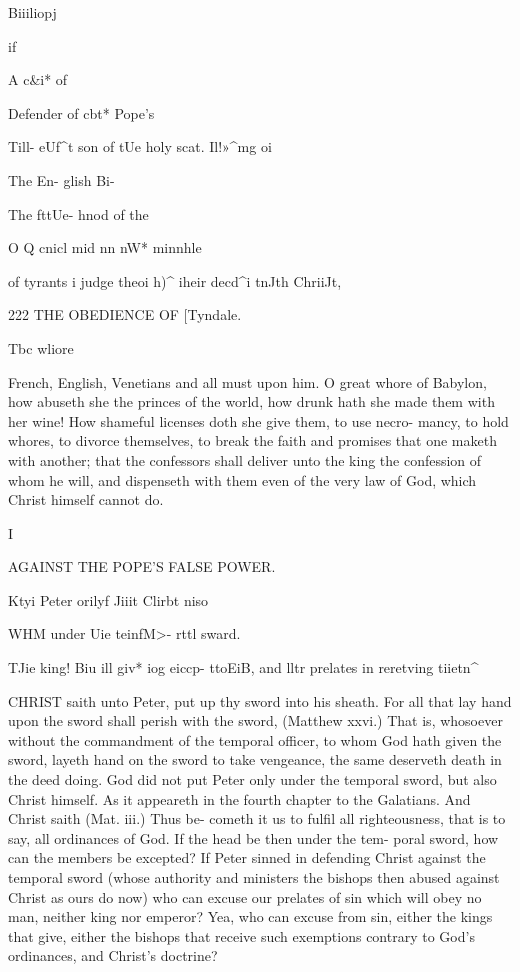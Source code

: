 \documentclass{custom}
\begin{document}
Biiiliopj {if 

A c&i* of 

Defender 
of cbt* 
Pope's 

Till- eUf^t 
son of tUe 
holy scat. 
Il!»^mg oi 

The En- 
glish Bi- 

The fttUe- 
hnod of the 

O Q cnicl 
mid nn nW* 
minnhle 

of tyrants i 
judge theoi 
h)^ iheir 
decd^i tnJth 
ChriiJt, 


222
THE OBEDIENCE OF
[Tyndale.

Tbc wliore 

French, English, Venetians and all must upon him. O 
great whore of Babylon, how abuseth she the princes of 
the world, how drunk hath she made them with her wine!
How shameful licenses doth she give them, to use necro- 
mancy, to hold whores, to divorce themselves, to break the 
faith and promises that one maketh with another; that the 
confessors shall deliver unto the king the confession of 
whom he will, and dispenseth with them even of the very 
law of God, which Christ himself cannot do. 

I 

AGAINST THE POPE'S FALSE POWER. 

Ktyi Peter 
orilyf Jiiit 
Clirbt niso 

WHM under 
Uie teinfM>- 
rttl sward. 

TJie king! 
Biu ill giv* 
iog eiccp- 
ttoEiB, and 
lltr prelates 
in reretving 
tiietn^ 

CHRIST saith unto Peter, put up thy sword into his sheath. 
For all that lay hand upon the sword shall perish with 
the sword, (Matthew xxvi.) That is, whosoever without the 
commandment of the temporal officer, to whom God hath 
given the sword, layeth hand on the sword to take vengeance,
the same deserveth death in the deed doing. God did 
not put Peter only under the temporal sword, but also
Christ himself. As it appeareth in the fourth chapter to
the Galatians. And Christ saith (Mat. iii.) Thus be-
cometh it us to fulfil all righteousness, that is to say, all 
ordinances of God. If the head be then under the tem- 
poral sword, how can the members be excepted? If 
Peter sinned in defending Christ against the temporal 
sword (whose authority and ministers the bishops then 
abused against Christ as ours do now) who can excuse our 
prelates of sin which will obey no man, neither king nor 
emperor? Yea, who can excuse from sin, either the kings 
that give, either the bishops that receive such exemptions 
contrary to God's ordinances, and Christ's doctrine? 

}
\end{document}
